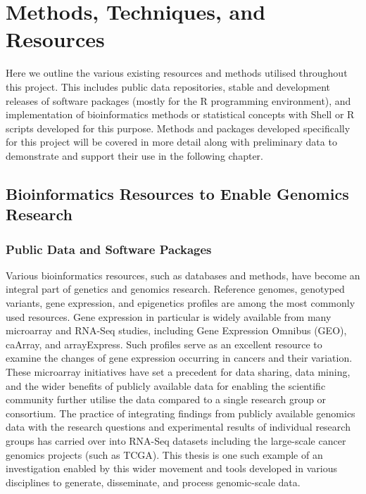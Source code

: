 \chapter{Methods, Techniques, and Resources}
\label{chap:methods}

Here we outline the various existing resources and methods utilised throughout this project. This includes public data repositories, stable and development releases of software packages (mostly for the R programming environment), and implementation of bioinformatics methods or statistical concepts with Shell or R scripts developed for this purpose. Methods and packages developed specifically for this project will be covered in more detail along with preliminary data to demonstrate and support their use in the following chapter. 

\section{Bioinformatics Resources to Enable Genomics Research}
\subsection{Public Data and Software Packages}
Various bioinformatics resources, such as databases and methods, have become an integral part of genetics and genomics research. Reference genomes, genotyped variants, gene expression, and epigenetics profiles are among the most commonly used resources. Gene expression in particular is widely available from many microarray and RNA-Seq studies, including Gene Expression Omnibus (GEO), caArray, and arrayExpress. Such profiles serve as an excellent resource to examine the changes of gene expression occurring in cancers and their variation. These microarray initiatives have set a precedent for data sharing, data mining, and the wider benefits of publicly available data for enabling the scientific community further utilise the data compared to a single research group or consortium. The practice of integrating findings from publicly available genomics data with the research questions and experimental results of individual research groups has carried over into RNA-Seq datasets including the large-scale cancer genomics projects (such as TCGA). This thesis is one such example of an investigation enabled by this wider movement and tools developed in various disciplines to generate, disseminate, and process genomic-scale data.
 
